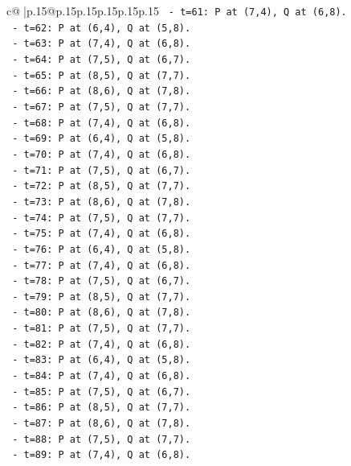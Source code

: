 \documentclass{article}
\begin{document}
{\begin{supertabular}{c@{$\;$}|p{.15\linewidth}@{}p{.15\linewidth}p{.15\linewidth}p{.15\linewidth}p{.15\linewidth}p{.15\linewidth}}
{{{\texttt{      {-} t=61: P at (7,4), Q at (6,8).} \\
\texttt{      {-} t=62: P at (6,4), Q at (5,8).} \\
\texttt{      {-} t=63: P at (7,4), Q at (6,8).} \\
\texttt{      {-} t=64: P at (7,5), Q at (6,7).} \\
\texttt{      {-} t=65: P at (8,5), Q at (7,7).} \\
\texttt{      {-} t=66: P at (8,6), Q at (7,8).} \\
\texttt{      {-} t=67: P at (7,5), Q at (7,7).} \\
\texttt{      {-} t=68: P at (7,4), Q at (6,8).} \\
\texttt{      {-} t=69: P at (6,4), Q at (5,8).} \\
\texttt{      {-} t=70: P at (7,4), Q at (6,8).} \\
\texttt{      {-} t=71: P at (7,5), Q at (6,7).} \\
\texttt{      {-} t=72: P at (8,5), Q at (7,7).} \\
\texttt{      {-} t=73: P at (8,6), Q at (7,8).} \\
\texttt{      {-} t=74: P at (7,5), Q at (7,7).} \\
\texttt{      {-} t=75: P at (7,4), Q at (6,8).} \\
\texttt{      {-} t=76: P at (6,4), Q at (5,8).} \\
\texttt{      {-} t=77: P at (7,4), Q at (6,8).} \\
\texttt{      {-} t=78: P at (7,5), Q at (6,7).} \\
\texttt{      {-} t=79: P at (8,5), Q at (7,7).} \\
\texttt{      {-} t=80: P at (8,6), Q at (7,8).} \\
\texttt{      {-} t=81: P at (7,5), Q at (7,7).} \\
\texttt{      {-} t=82: P at (7,4), Q at (6,8).} \\
\texttt{      {-} t=83: P at (6,4), Q at (5,8).} \\
\texttt{      {-} t=84: P at (7,4), Q at (6,8).} \\
\texttt{      {-} t=85: P at (7,5), Q at (6,7).} \\
\texttt{      {-} t=86: P at (8,5), Q at (7,7).} \\
\texttt{      {-} t=87: P at (8,6), Q at (7,8).} \\
\texttt{      {-} t=88: P at (7,5), Q at (7,7).} \\
\texttt{      {-} t=89: P at (7,4), Q at (6,8).} \\
}}}
\end{supertabular}}
\end{document}
